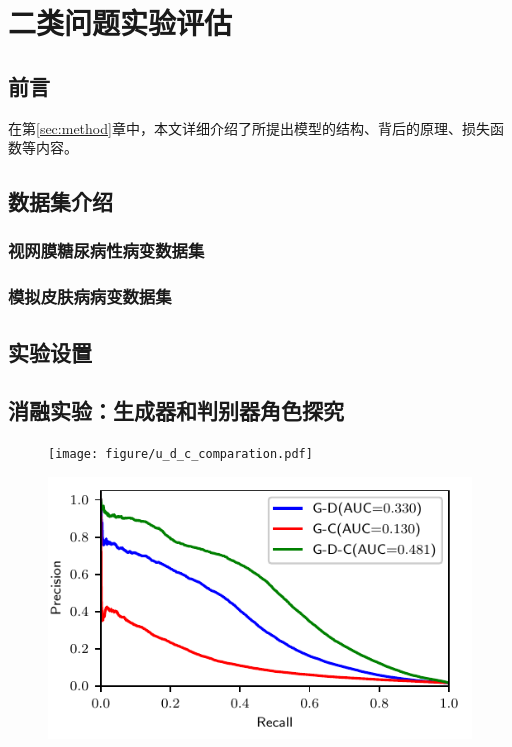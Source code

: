\chapter{二类问题实验评估}\label{sec:experiments}
\section{前言}
在第\ref{sec:method}章中，本文详细介绍了所提出模型的结构、背后的原理、损失函数等内容。
\section{数据集介绍}
\subsection{视网膜糖尿病性病变数据集}
\subsection{模拟皮肤病病变数据集}
\section{实验设置}
\section{消融实验：生成器和判别器角色探究}
\begin{figure}[h]
	\centering
	\texttt{[image: figure/u\_d\_c\_comparation.pdf]}
	\caption{} 
	\label{fig:u_d_c_comparation}
\end{figure}
\begin{figure}[h]
	\centering
	\includegraphics[width=1.0\textwidth]{figure/pr_cureve_u_d_u_c_u_d_c_components.pdf}
	\caption{} 
	\label{fig:u_d_c_comparation_pr_curve}
\end{figure}
